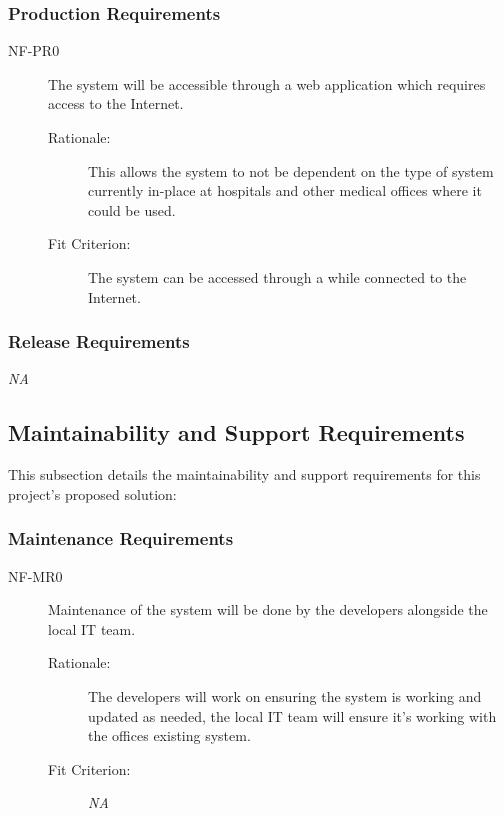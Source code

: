 \documentclass[12pt]{article}
\begin{document}
\subsubsection{Production Requirements}
\begin{description}
    \item[NF-PR0] The system will be accessible through a web application which requires access to the Internet.  
    \begin{description}
        \item[Rationale:] This allows the system to not be dependent on the type of system currently in-place at hospitals and other medical offices where it could be used. 
        \item[Fit Criterion:] The system can be accessed through a while connected to the Internet. 
    \end{description}
\end{description}

\subsubsection{Release Requirements}
\textit{NA}

\subsection{Maintainability and Support Requirements}
This subsection details the maintainability and support requirements for this project's proposed solution: 

\subsubsection{Maintenance Requirements}
\begin{description}
    \item[NF-MR0] Maintenance of the system will be done by the developers alongside the local IT team.
    \begin{description}
        \item[Rationale:] The developers will work on ensuring the system is working and updated as needed, the local IT team will ensure it's working with the offices existing system. 
        \item[Fit Criterion:] \textit{NA}
    \end{description}
\end{description}
\end{document}
